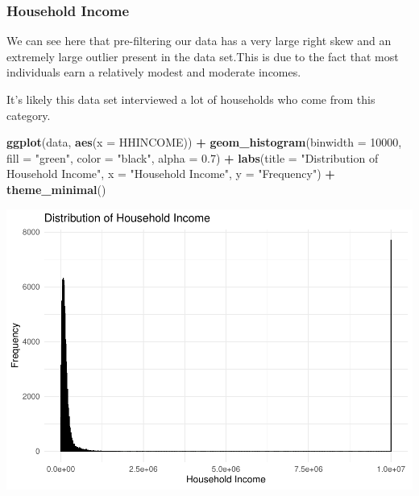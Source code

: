\documentclass[
]{article}
\newenvironment{Shaded}{\begin{snugshade}}{\end{snugshade}}
\newcommand{\AttributeTok}[1]{\textcolor[rgb]{0.13,0.29,0.53}{#1}}
\newcommand{\DecValTok}[1]{\textcolor[rgb]{0.00,0.00,0.81}{#1}}
\newcommand{\FloatTok}[1]{\textcolor[rgb]{0.00,0.00,0.81}{#1}}
\newcommand{\FunctionTok}[1]{\textcolor[rgb]{0.13,0.29,0.53}{\textbf{#1}}}
\newcommand{\NormalTok}[1]{#1}
\newcommand{\SpecialCharTok}[1]{\textcolor[rgb]{0.81,0.36,0.00}{\textbf{#1}}}
\newcommand{\StringTok}[1]{\textcolor[rgb]{0.31,0.60,0.02}{#1}}
\begin{document}
\subsubsection{Household Income}\label{household-income}

We can see here that pre-filtering our data has a very large right skew
and an extremely large outlier present in the data set.This is due to
the fact that most individuals earn a relatively modest and moderate
incomes.

It's likely this data set interviewed a lot of households who come from
this category.

\begin{Shaded}
\begin{Highlighting}[]
\FunctionTok{ggplot}\NormalTok{(data, }\FunctionTok{aes}\NormalTok{(}\AttributeTok{x =}\NormalTok{ HHINCOME)) }\SpecialCharTok{+}
  \FunctionTok{geom\_histogram}\NormalTok{(}\AttributeTok{binwidth =} \DecValTok{10000}\NormalTok{, }\AttributeTok{fill =} \StringTok{"green"}\NormalTok{, }\AttributeTok{color =} \StringTok{"black"}\NormalTok{, }\AttributeTok{alpha =} \FloatTok{0.7}\NormalTok{) }\SpecialCharTok{+}
  \FunctionTok{labs}\NormalTok{(}\AttributeTok{title =} \StringTok{"Distribution of Household Income"}\NormalTok{, }\AttributeTok{x =} \StringTok{"Household Income"}\NormalTok{, }\AttributeTok{y =} \StringTok{"Frequency"}\NormalTok{) }\SpecialCharTok{+}
  \FunctionTok{theme\_minimal}\NormalTok{()}
\end{Highlighting}
\end{Shaded}

\includegraphics{Project_1_456_files/figure-latex/unnamed-chunk-6-1.pdf}
\end{document}
